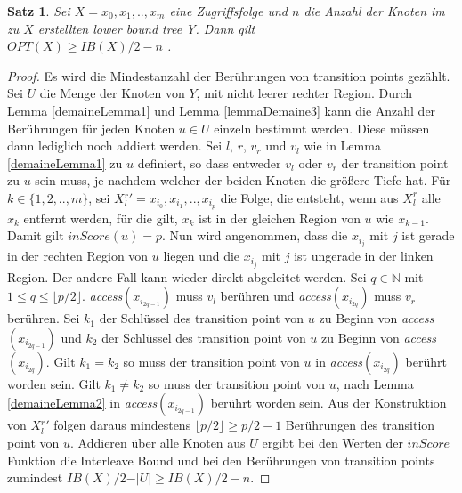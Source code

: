 \documentclass[a4paper,12pt]{article}
\newtheorem{Satz}{Satz}[section]
\begin{document}
\begin{Satz} \label{satzDemaine1}
	Sei $X = x_0, x_1,.., x_m$  eine Zugriffsfolge und $n$ die Anzahl der Knoten im zu $X$ erstellten lower bound tree Y. Dann gilt\\	
	$\mathit{OPT}\left(X\right) \geq \mathit{IB}\left(X\right) /2 - n$ .
\end{Satz}
\begin{proof}
	Es wird die Mindestanzahl der Berührungen von transition points gezählt. Sei $U$ die Menge der Knoten von $Y$, mit nicht leerer rechter Region. Durch Lemma \ref{demaineLemma1} und Lemma \ref{lemmaDemaine3} kann die Anzahl der Berührungen für jeden Knoten $u \in U$ einzeln bestimmt werden. Diese müssen dann lediglich noch addiert werden. Sei $l$, $r$, $v_r$ und $v_l$ wie in Lemma \ref{demaineLemma1} zu $u$ definiert, so dass entweder $v_l$ oder $v_r$ der transition point zu $u$ sein muss, je nachdem welcher der beiden Knoten die größere Tiefe hat. Für $k \in \{1, 2,.., m\}$, sei \mbox{$X{^r_l}' = x_{i_0},x_{i_1},..,x_{i_p}$} die Folge, die entsteht, wenn aus $X^r_l$ alle $x_k$ entfernt werden, für die gilt, $x_k$ ist in der gleichen Region von $u$ wie $x_{k-1}$. Damit gilt $\mathit{inScore}\left(u\right) = p$. Nun wird angenommen, dass die $x_{i_j}$ mit $j$ ist gerade in der rechten Region von $u$ liegen und die $x_{i_j}$ mit $j$ ist ungerade in der linken Region. Der andere Fall kann wieder direkt abgeleitet werden. Sei $q \in \mathbb{N}$ mit $1 \leq q \leq \lfloor p / 2 \rfloor$. \textit{access}$\left( x_{i_{2q-1}} \right)$ muss $v_l$ berühren und \textit{access}$\left( x_{i_{2q}} \right)$ muss $v_r$ berühren. Sei $k_{1}$ der Schlüssel des transition point von $u$ zu Beginn von \textit{access}$\left( x_{i_{2q-1}} \right)$ und  $k_{2}$ der Schlüssel des transition point von $u$ zu Beginn von \textit{access}$\left( x_{i_{2q}} \right)$. Gilt $k_{1} = k_{2}$ so muss der transition point von $u$ in \textit{access}$\left( x_{i_{2q}} \right)$ berührt worden sein.  Gilt $k_{1} \ne k_{2}$ so muss der transition point von $u$, nach Lemma \ref{demaineLemma2} in \textit{access}$\left( x_{i_{2q-1}} \right)$ berührt worden sein. Aus der Konstruktion von $X{^r_l}'$ folgen daraus mindestens $\lfloor p/2 \rfloor \geq p/2 - 1$ Berührungen des transition point von $u$. Addieren über alle Knoten aus $U$ ergibt bei den Werten der $\mathit{inScore}$ Funktion die Interleave Bound und bei den Berührungen von transition points zumindest  $\mathit{IB}\left(X\right) /2 - \vert U \vert \geq \mathit{IB}\left(X\right) /2 - n$.
	
\end{proof}
\end{document}
